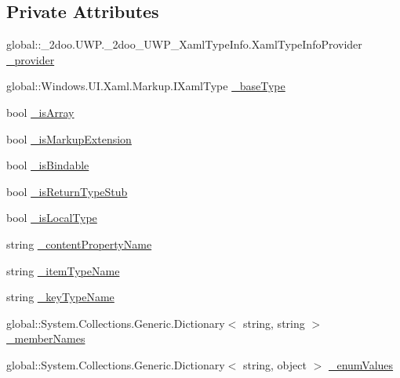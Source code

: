 \subsection*{Private Attributes}
\begin{CompactItemize}
\item 
global::\_\-2doo.UWP.\_\-2doo\_\-UWP\_\-XamlTypeInfo.XamlTypeInfoProvider \hyperlink{class__2doo_1_1_u_w_p_1_1__2doo___u_w_p___xaml_type_info_1_1_xaml_user_type_6811ea912da9da65cae5d9742dcdec21}{\_\-provider}
\item 
global::Windows.UI.Xaml.Markup.IXamlType \hyperlink{class__2doo_1_1_u_w_p_1_1__2doo___u_w_p___xaml_type_info_1_1_xaml_user_type_41e7b6d8c2c2b546a3e4bdb931493306}{\_\-baseType}
\item 
bool \hyperlink{class__2doo_1_1_u_w_p_1_1__2doo___u_w_p___xaml_type_info_1_1_xaml_user_type_aaf13d5f05014452a52f8494199bf25b}{\_\-isArray}
\item 
bool \hyperlink{class__2doo_1_1_u_w_p_1_1__2doo___u_w_p___xaml_type_info_1_1_xaml_user_type_6353b2dd2893a4f1e7f8e785d3bf856b}{\_\-isMarkupExtension}
\item 
bool \hyperlink{class__2doo_1_1_u_w_p_1_1__2doo___u_w_p___xaml_type_info_1_1_xaml_user_type_3dbc086de4f9f66f232e8ffa16c153cc}{\_\-isBindable}
\item 
bool \hyperlink{class__2doo_1_1_u_w_p_1_1__2doo___u_w_p___xaml_type_info_1_1_xaml_user_type_2b1651aa19ef2b16c2c2cc159954023f}{\_\-isReturnTypeStub}
\item 
bool \hyperlink{class__2doo_1_1_u_w_p_1_1__2doo___u_w_p___xaml_type_info_1_1_xaml_user_type_df1dc850a5574fa385e8ed8e1bbcbf2e}{\_\-isLocalType}
\item 
string \hyperlink{class__2doo_1_1_u_w_p_1_1__2doo___u_w_p___xaml_type_info_1_1_xaml_user_type_6fb618b03a33c30e676d67a4d46ba28f}{\_\-contentPropertyName}
\item 
string \hyperlink{class__2doo_1_1_u_w_p_1_1__2doo___u_w_p___xaml_type_info_1_1_xaml_user_type_8d99eecd69f3636be67f8539712777e8}{\_\-itemTypeName}
\item 
string \hyperlink{class__2doo_1_1_u_w_p_1_1__2doo___u_w_p___xaml_type_info_1_1_xaml_user_type_e96600f43af95d89dab6ccb224d34a58}{\_\-keyTypeName}
\item 
global::System.Collections.Generic.Dictionary$<$ string, string $>$ \hyperlink{class__2doo_1_1_u_w_p_1_1__2doo___u_w_p___xaml_type_info_1_1_xaml_user_type_40389957430b9267ba3ceea32542bec0}{\_\-memberNames}
\item 
global::System.Collections.Generic.Dictionary$<$ string, object $>$ \hyperlink{class__2doo_1_1_u_w_p_1_1__2doo___u_w_p___xaml_type_info_1_1_xaml_user_type_a4ffefe44231ddcde5e003255d6d49b5}{\_\-enumValues}
\end{CompactItemize}


